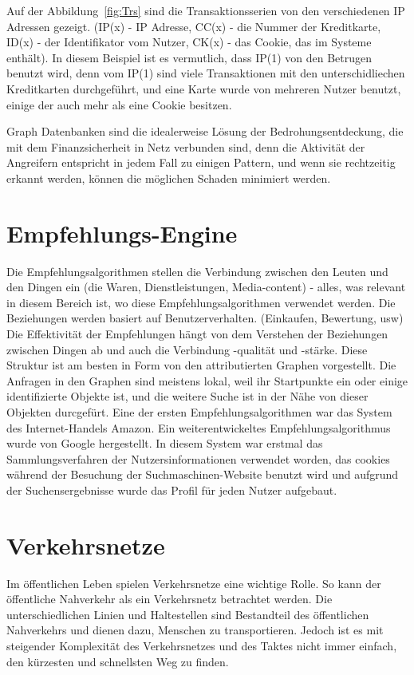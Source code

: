 Auf der Abbildung~\ref{fig:Trs} sind die Transaktionsserien von den verschiedenen IP Adressen gezeigt. (IP(x) - IP Adresse, CC(x) - die Nummer der Kreditkarte, ID(x) - der Identifikator vom Nutzer, CK(x) - das Cookie, das im Systeme enthält). In diesem Beispiel ist es vermutlich, dass IP(1) von den Betrugen benutzt wird, denn vom IP(1) sind viele Transaktionen mit den unterschidliechen Kreditkarten durchgeführt, und eine Karte wurde von mehreren Nutzer benutzt, einige der auch mehr als eine Cookie besitzen.\cite{Betrugserkennung}

Graph Datenbanken sind die idealerweise Lösung der Bedrohungsentdeckung, die mit dem Finanzsicherheit in Netz verbunden sind, denn die Aktivität der Angreifern entspricht in jedem Fall zu einigen Pattern, und wenn sie rechtzeitig erkannt werden, können die möglichen Schaden minimiert werden.

\section{Empfehlungs-Engine}
Die Empfehlungsalgorithmen stellen die Verbindung zwischen den Leuten und den Dingen ein (die Waren, Dienstleistungen, Media-content) - alles, was relevant in diesem Bereich ist, wo diese Empfehlungsalgorithmen verwendet werden. Die Beziehungen werden basiert auf Benutzerverhalten. (Einkaufen, Bewertung, usw)
Die Effektivität der Empfehlungen hängt von dem Verstehen der Beziehungen zwischen Dingen ab und auch die Verbindung -qualität und -stärke. Diese Struktur ist am besten in Form von den attributierten Graphen vorgestellt. Die Anfragen in den Graphen sind meistens lokal, weil ihr Startpunkte ein oder einige identifizierte Objekte ist, und die weitere Suche ist in der Nähe von dieser Objekten durcgefürt.
Eine der ersten Empfehlungsalgorithmen war das System des Internet-Handels Amazon. Ein weiterentwickeltes Empfehlungsalgorithmus wurde von Google hergestellt. In diesem System war erstmal das Sammlungsverfahren der Nutzersinformationen verwendet worden, das cookies während der Besuchung der Suchmaschinen-Website benutzt wird und aufgrund der Suchensergebnisse wurde das Profil für jeden Nutzer aufgebaut.
\cite[p.~107]{GraphDB}

\section{Verkehrsnetze}
Im öffentlichen Leben spielen Verkehrsnetze eine wichtige Rolle. So kann der öffentliche Nahverkehr als ein Verkehrsnetz betrachtet werden. Die unterschiedlichen Linien und Haltestellen sind Bestandteil des öffentlichen Nahverkehrs und dienen dazu, Menschen zu transportieren. Jedoch ist es mit steigender Komplexität des Verkehrsnetzes und des Taktes nicht immer einfach, den kürzesten und schnellsten Weg zu finden.


